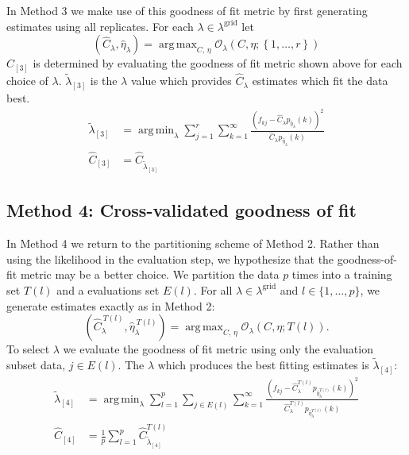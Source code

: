 \documentclass[oupdraft]{bio}
\DeclareMathOperator*{\argmin}{arg\,min}
\DeclareMathOperator*{\argmax}{arg\,max}
\newcommand{\lambdagrid}{\lambda^{\text{grid}}}
\begin{document}
In Method 3 we make use of this goodness of fit metric by first generating estimates using all replicates.  For each $\lambda \in \lambdagrid$ let
\begin{equation}
\left(\widehat{C}_{\lambda}, \widehat{\eta}_{\lambda} \right) = \argmax_{C, \, \eta} \mathcal{O}_\lambda \left(C, \eta; \left\{1, \dots, r \right\} \right) \label{eq:c_hat_lambdas_method_3}
\end{equation}
$\widehat{C}_{[3]}$ is determined by evaluating the goodness of fit metric shown above for each choice of $\lambda$.  $\widetilde{\lambda}_{[3]}$ is the $\lambda$ value which provides $\widehat{C}_{\lambda}$ estimates which fit the data best.
\begin{align}
\widetilde{\lambda}_{[3]} &= \argmin_{\lambda} \sum_{j=1}^r \sum_{k=1}^{\infty} \frac{ \left( f_{kj} - \widehat{C}_{\lambda} p_{\widehat{\eta}_{\lambda}}(k) \right)^2}{\widehat{C}_{\lambda}p_{\widehat{\eta}_{\lambda}}(k)} \label{eq:selected_lambda_3} \\
\widehat{C}_{[3]} &= \widehat{C}_{\widetilde{\lambda}_{[3]}}
\end{align}

%
%
%
\subsection{Method 4: Cross-validated goodness of fit}

In Method 4 we return to the partitioning scheme of Method 2.  Rather than using the likelihood in the evaluation step, we hypothesize that the goodness-of-fit metric may be a better choice.
We partition the data $p$ times into a training set $T(l)$ and a evaluations set $E(l)$.
For all $\lambda \in \lambdagrid$ and $l \in \{1, \dots , p \}$, we generate estimates exactly as in Method 2:
\begin{equation}
\left(\widehat{C}_{\lambda}^{ \ T(l)}, \widehat{\eta}_{\lambda}^{ \ T(l)} \right) = \argmax_{C, \, \eta} \mathcal{O}_\lambda \left(C, \eta; T(l) \right). \label{eq:c_hat_lambda_method_4}
\end{equation}
To select $\lambda$ we evaluate the goodness of fit metric using only the evaluation subset data, $j \in E(l)$.  The $\lambda$ which produces the best fitting estimates is $\widetilde{\lambda}_{[4]}$:
\begin{align}
\widetilde{\lambda}_{[4]} &= \argmin_{\lambda} \sum_{l = 1}^p \sum_{j \in E(l)} \sum_{k=1}^{\infty} \frac{ \left( f_{kj} - \widehat{C}_{\lambda}^{T(l)} p_{\widehat{\eta}_{\lambda}^{T(l)}}(k) \right)^2}{\widehat{C}_{\lambda}^{T(l)}p_{\widehat{\eta}_{\lambda}^{T(l)}}(k)} \\
\widehat{C}_{[4]} &= \frac{1}{p} \sum_{l=1}^p \widehat{C}_{\widetilde{\lambda}_{[4]}}^{T(l)}
\end{align}
\end{document}
